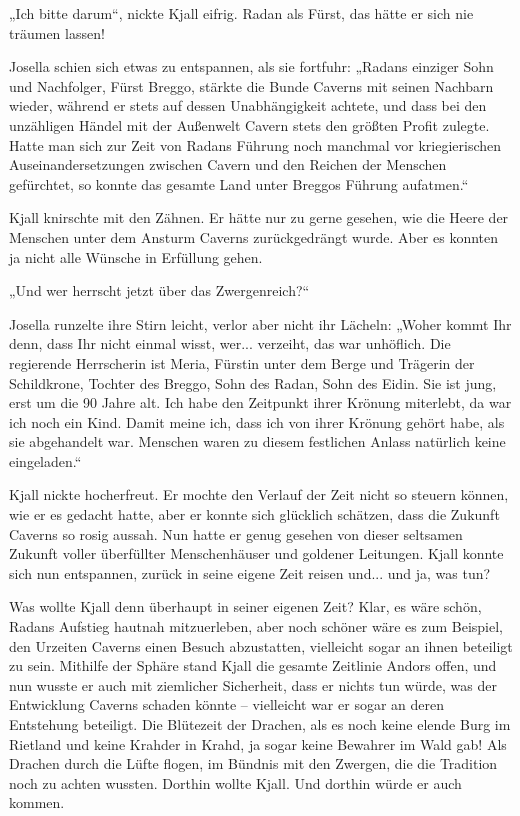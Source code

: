 \documentclass[10pt, a4paper, oneside]{book}
\begin{document}
„Ich bitte darum“, nickte Kjall eifrig. Radan als Fürst, das hätte er sich nie träumen lassen!

Josella schien sich etwas zu entspannen, als sie fortfuhr: „Radans einziger Sohn und Nachfolger, Fürst Breggo, stärkte die Bunde Caverns mit seinen Nachbarn wieder, während er stets auf dessen Unabhängigkeit achtete, und dass bei den unzähligen Händel mit der Außenwelt Cavern stets den größten Profit zulegte. Hatte man sich zur Zeit von Radans Führung noch manchmal vor kriegierischen Auseinandersetzungen zwischen Cavern und den Reichen der Menschen gefürchtet, so konnte das gesamte Land unter Breggos Führung aufatmen.“

Kjall knirschte mit den Zähnen. Er hätte nur zu gerne gesehen, wie die Heere der Menschen unter dem Ansturm Caverns zurückgedrängt wurde. Aber es konnten ja nicht alle Wünsche in Erfüllung gehen.

„Und wer herrscht jetzt über das Zwergenreich?“

Josella runzelte ihre Stirn leicht, verlor aber nicht ihr Lächeln: „Woher kommt Ihr denn, dass Ihr nicht einmal wisst, wer... verzeiht, das war unhöflich. Die regierende Herrscherin ist Meria, Fürstin unter dem Berge und Trägerin der Schildkrone, Tochter des Breggo, Sohn des Radan, Sohn des Eidin. Sie ist jung, erst um die 90 Jahre alt. Ich habe den Zeitpunkt ihrer Krönung miterlebt, da war ich noch ein Kind. Damit meine ich, dass ich von ihrer Krönung gehört habe, als sie abgehandelt war. Menschen waren zu diesem festlichen Anlass natürlich keine eingeladen.“

Kjall nickte hocherfreut. Er mochte den Verlauf der Zeit nicht so steuern können, wie er es gedacht hatte, aber er konnte sich glücklich schätzen, dass die Zukunft Caverns so rosig aussah. Nun hatte er genug gesehen von dieser seltsamen Zukunft voller überfüllter Menschenhäuser und goldener Leitungen. Kjall konnte sich nun entspannen, zurück in seine eigene Zeit reisen und... und ja, was tun?

Was wollte Kjall denn überhaupt in seiner eigenen Zeit? Klar, es wäre schön, Radans Aufstieg hautnah mitzuerleben, aber noch schöner wäre es zum Beispiel, den Urzeiten Caverns einen Besuch abzustatten, vielleicht sogar an ihnen beteiligt zu sein. Mithilfe der Sphäre stand Kjall die gesamte Zeitlinie Andors offen, und nun wusste er auch mit ziemlicher Sicherheit, dass er nichts tun würde, was der Entwicklung Caverns schaden könnte – vielleicht war er sogar an deren Entstehung beteiligt. Die Blütezeit der Drachen, als es noch keine elende Burg im Rietland und keine Krahder in Krahd, ja sogar keine Bewahrer im Wald gab! Als Drachen durch die Lüfte flogen, im Bündnis mit den Zwergen, die die Tradition noch zu achten wussten. Dorthin wollte Kjall. Und dorthin würde er auch kommen.
\end{document}
